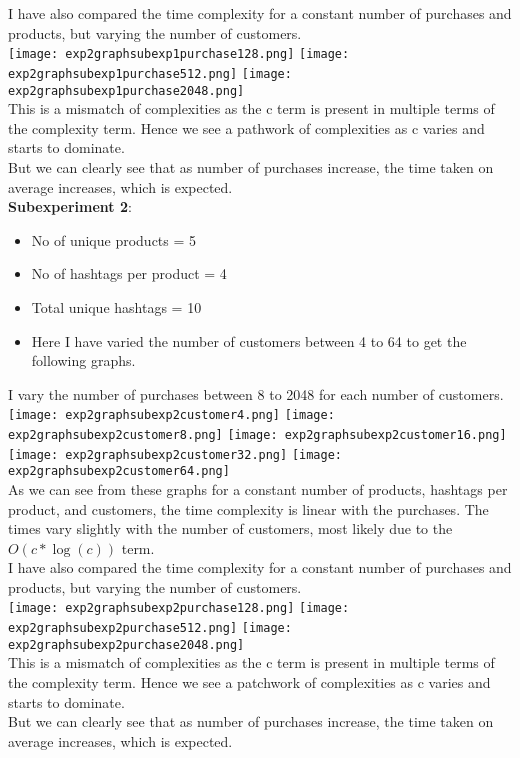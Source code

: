 \documentclass[12pt]{article}
\begin{document}
I have also compared the time complexity for a constant number of purchases and products, but varying the number of customers.\\
\texttt{[image: exp2graphsubexp1purchase128.png]}
\texttt{[image: exp2graphsubexp1purchase512.png]}
\texttt{[image: exp2graphsubexp1purchase2048.png]}\\
This is a mismatch of complexities as the c term is present in multiple terms of the complexity term. Hence we see a pathwork of complexities as c varies and starts to dominate.\\
But we can clearly see that as number of purchases increase, the time taken on average increases, which is expected.\\

\textbf{Subexperiment 2}:\\
\begin{itemize}
    \item No of unique products = 5
    \item No of hashtags per product = 4
    \item Total unique hashtags = 10
    \item Here I have varied the number of customers between 4 to 64 to get the following graphs.
\end{itemize}
I vary the number of purchases between 8 to 2048 for each number of customers.\\
\texttt{[image: exp2graphsubexp2customer4.png]}
\texttt{[image: exp2graphsubexp2customer8.png]}
\texttt{[image: exp2graphsubexp2customer16.png]}
\texttt{[image: exp2graphsubexp2customer32.png]}
\texttt{[image: exp2graphsubexp2customer64.png]}\\
As we can see from these graphs for a constant number of products, hashtags per product, and customers, the time complexity is linear with the purchases. The times vary slightly with the number of customers, most likely due to the $O(c*\log(c))$ term.\\
I have also compared the time complexity for a constant number of purchases and products, but varying the number of customers.\\
\texttt{[image: exp2graphsubexp2purchase128.png]}
\texttt{[image: exp2graphsubexp2purchase512.png]}
\texttt{[image: exp2graphsubexp2purchase2048.png]}\\
This is a mismatch of complexities as the c term is present in multiple terms of the complexity term. Hence we see a patchwork of complexities as c varies and starts to dominate.\\
But we can clearly see that as number of purchases increase, the time taken on average increases, which is expected.\\
\end{document}

